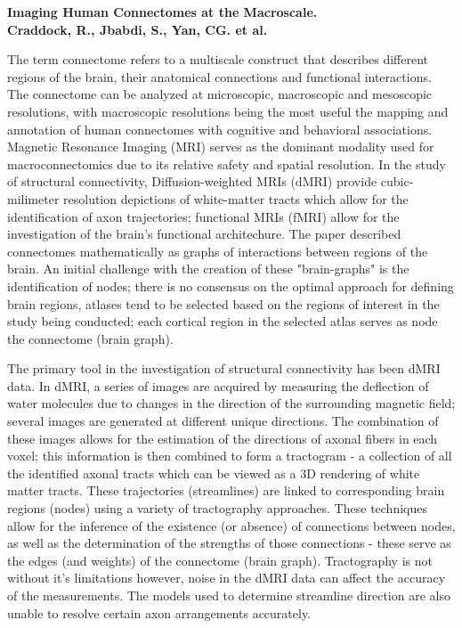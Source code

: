 \documentclass[11pt, letterpaper]{article}
\begin{document}
\begin{center}
    \large\textbf{Imaging Human Connectomes at the Macroscale.\\
                  Craddock, R., Jbabdi, S., Yan, CG. et al.}
\end{center}

The term connectome refers to a multiscale construct that describes different 
regions of the brain, their anatomical connections and functional interactions. 
The connectome can be analyzed at microscopic, macroscopic and mesoscopic 
resolutions, with macroscopic resolutions being the most useful the mapping and 
annotation of human connectomes with cognitive and behavioral associations. 
Magnetic Resonance Imaging (MRI) serves as the dominant modality used for 
macroconnectomics due to its relative safety and spatial resolution. In the 
study of structural connectivity, Diffusion-weighted MRIs (dMRI) provide 
cubic-milimeter resolution depictions of white-matter tracts which allow for 
the identification of axon trajectories; functional MRIs (fMRI) allow for the 
investigation of the brain's functional architechure. The paper described 
connectomes mathematically as graphs of interactions between regions of the 
brain. An initial challenge with the creation of these "brain-graphs" is the 
identification of nodes; there is no consensus on the optimal approach for 
defining brain regions, atlases tend to be selected based on the regions of 
interest in the study being conducted; each cortical region in the selected 
atlas serves as node the connectome (brain graph).

The primary tool in the investigation of structural connectivity has been dMRI 
data. In dMRI, a series of images are acquired by measuring the deflection of 
water molecules due to changes in the direction of the surrounding magnetic 
field; several images are generated at different unique directions. The 
combination of these images allows for the estimation of the directions of 
axonal fibers in each voxel; this information is then combined to form a 
tractogram - a collection of all the identified axonal tracts which can be 
viewed as a 3D rendering of white matter tracts. These trajectories 
(streamlines) are linked to corresponding brain regions (nodes) using a variety 
of tractography approaches. These techniques allow for the inference of the 
existence (or absence) of connections between nodes, as well as the 
determination of the strengths of those connections - these serve as the edges 
(and weights) of the connectome (brain graph). Tractography is not without it's 
limitations however, noise in the dMRI data can affect the accuracy of the 
measurements. The models used to determine streamline direction are also unable 
to resolve certain axon arrangements accurately.
\end{document}
